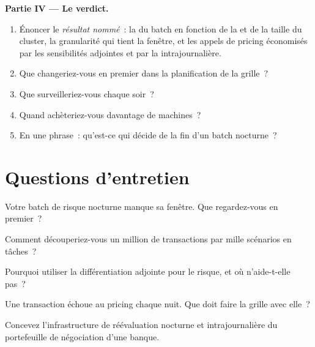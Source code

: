 \begin{problem}
\medskip\noindent\textbf{Partie IV --- Le verdict.}
\begin{enumerate}[resume]
\item Énoncer le \emph{résultat nommé}~: la  du batch en fonction de la  et de la taille du cluster, la granularité qui tient la
fenêtre, et les appels de pricing économisés par les sensibilités adjointes et par la  intrajournalière.
\item Que changeriez-vous en premier dans la planification de la grille~?
\item Que surveilleriez-vous chaque soir~?
\item Quand achèteriez-vous davantage de machines~?
\item En une phrase~: qu'est-ce qui décide de la fin d'un batch nocturne~?
\end{enumerate}
\end{problem}

\section{Questions d'entretien}

\begin{interviewq}\label{iq:pl:the-risk-grid:1}
Votre batch de risque nocturne manque sa fenêtre. Que regardez-vous en premier~?
\end{interviewq}

\begin{interviewq}\label{iq:pl:the-risk-grid:2}
Comment découperiez-vous un million de transactions par mille scénarios en tâches~?
\end{interviewq}

\begin{interviewq}\label{iq:pl:the-risk-grid:3}
Pourquoi utiliser la différentiation adjointe pour le risque, et où n'aide-t-elle pas~?
\end{interviewq}

\begin{interviewq}\label{iq:pl:the-risk-grid:4}
Une transaction échoue au pricing chaque nuit. Que doit faire la grille avec elle~?
\end{interviewq}

\begin{interviewq}\label{iq:pl:the-risk-grid:5}
Concevez l'infrastructure de réévaluation nocturne et intrajournalière du portefeuille de négociation d'une banque.
\end{interviewq}
